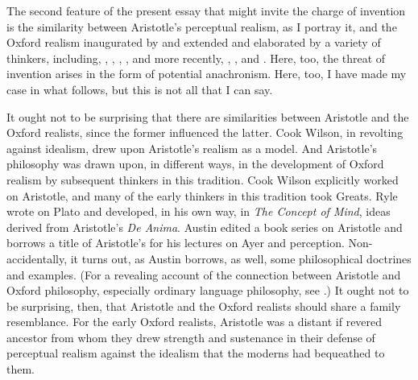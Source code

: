 The second feature of the present essay that might invite the charge of invention is the similarity between Aristotle's perceptual realism, as I portray it, and the Oxford realism inaugurated by \citet{Cook-Wilson:1926sf} and extended and elaborated by a variety of thinkers, including, \citet{Prichard:1909yg,Prichard:1950kx}, \citet{Ryle:1949qr}, \citet{Austin:1961bs,Austin:1962lr}, \citet{Hinton:1973js}, and more recently, \citet{McDowell:1994am}, \citet{Travis:2008la}, and \citet{Williamson:2000lr}. Here, too, the threat of invention arises in the form of potential anachronism. Here, too, I have made my case in what follows, but this is not all that I can say. 

It ought not to be surprising that there are similarities between Aristotle and the Oxford realists, since the former influenced the latter. Cook Wilson, in revolting against idealism, drew upon Aristotle's realism as a model. And Aristotle's philosophy was drawn upon, in different ways, in the development of Oxford realism by subsequent thinkers in this tradition. Cook Wilson explicitly worked on Aristotle, and many of the early thinkers in this tradition took Greats. Ryle wrote on Plato and developed, in his own way, in \emph{The Concept of Mind}, ideas derived from Aristotle's \emph{De Anima}. Austin edited a book series on Aristotle and borrows a title of Aristotle's for his lectures on Ayer and perception. Non-accidentally, it turns out, as Austin borrows, as well, some philosophical doctrines and examples. (For a revealing account of the connection between Aristotle and Oxford philosophy, especially ordinary language philosophy, see \citealt[Introduction]{Ackrill:1997tg}.) It ought not to be surprising, then, that Aristotle and the Oxford realists should share a family resemblance. For the early Oxford realists, Aristotle was a distant if revered ancestor from whom they drew strength and sustenance in their defense of perceptual realism against the idealism that the moderns had bequeathed to them.

